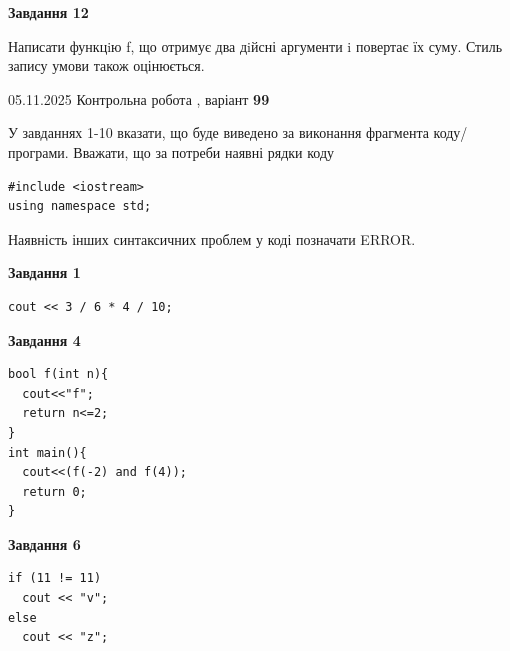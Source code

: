 \documentclass[12pt, ukrainian]{article}
\begin{document}
{\begin {large}
\begin{minipage}[t]{11.0cm}
\begin{center}
\textbf{Завдання 12}
\end{center}

Написати функцiю f, що отримує два дiйсні аргументи i повертає їх суму. Стиль запису умови також оцінюється.\par

\end{minipage}

\end {large}}
\newpage

{\Large{05.11.2025 Контрольна робота , варіант  \No \textbf { 99 }\par}}
{
\begin {large}
У завданнях 1-10 вказати, що буде виведено за виконання фрагмента коду/про\-гра\-ми.
Вважати, що за потреби наявні рядки коду
\begin{verbatim}
#include <iostream>
using namespace std;
\end{verbatim}
Наявність інших синтаксичних проблем у коді позначати ERROR.

\begin{minipage}[t]{7.0cm}

\begin{center}
\textbf{Завдання 1}
\end{center}
\vspace{-8mm}

\begin{verbatim}
cout << 3 / 6 * 4 / 10;
\end{verbatim}



\begin{center}
\textbf{Завдання 4}
\end{center}
\vspace{-8mm}

\begin{verbatim}
bool f(int n){
  cout<<"f";
  return n<=2;
}
int main(){
  cout<<(f(-2) and f(4));
  return 0;
}
\end{verbatim}



\begin{center}
\textbf{Завдання 6}
\end{center}
\vspace{-8mm}

\begin{verbatim}
if (11 != 11)
  cout << "v";
else
  cout << "z";
\end{verbatim}




\end{minipage}
\end{large}}
\end{document}
